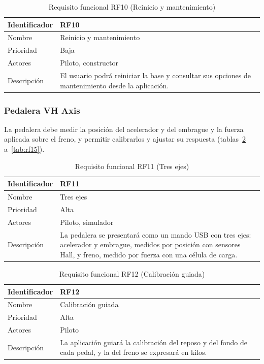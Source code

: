 \begin{table}[H]
	\centering
	\renewcommand{\arraystretch}{2}
	\begin{tabular}{|l|p{10cm}|}
		\hline
		Identificador & RF10 \\
		\hline
		Nombre & Reinicio y mantenimiento \\
		\hline
		Prioridad & Baja \\
		\hline
		Actores & Piloto, constructor \\
		\hline
		Descripción & El usuario podrá reiniciar la base y consultar sus opciones de mantenimiento desde la aplicación. \\
		\hline
	\end{tabular}
	\caption{Requisito funcional RF10 (Reinicio y mantenimiento)}
	\label{tab:rf10}
\end{table}

\subsubsection{Pedalera VH Axis}

La pedalera debe medir la posición del acelerador y del embrague y la fuerza aplicada sobre el freno, y permitir calibrarlos y ajustar su respuesta (tablas~\ref{tab:rf11} a~\ref{tab:rf15}).

\begin{table}[H]
	\centering
	\renewcommand{\arraystretch}{2}
	\begin{tabular}{|l|p{10cm}|}
		\hline
		Identificador & RF11 \\
		\hline
		Nombre & Tres ejes \\
		\hline
		Prioridad & Alta \\
		\hline
		Actores & Piloto, simulador \\
		\hline
		Descripción & La pedalera se presentará como un mando USB con tres ejes: acelerador y embrague, medidos por posición con sensores Hall, y freno, medido por fuerza con una célula de carga. \\
		\hline
	\end{tabular}
	\caption{Requisito funcional RF11 (Tres ejes)}
	\label{tab:rf11}
\end{table}

\begin{table}[H]
	\centering
	\renewcommand{\arraystretch}{2}
	\begin{tabular}{|l|p{10cm}|}
		\hline
		Identificador & RF12 \\
		\hline
		Nombre & Calibración guiada \\
		\hline
		Prioridad & Alta \\
		\hline
		Actores & Piloto \\
		\hline
		Descripción & La aplicación guiará la calibración del reposo y del fondo de cada pedal, y la del freno se expresará en kilos. \\
		\hline
	\end{tabular}
	\caption{Requisito funcional RF12 (Calibración guiada)}
	\label{tab:rf12}
\end{table}

